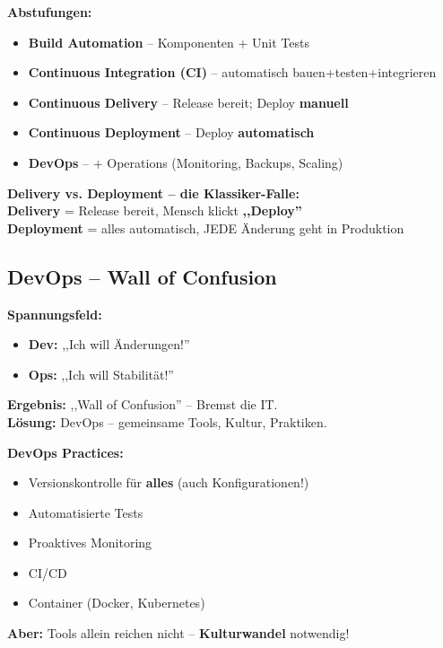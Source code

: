 \documentclass[11pt,a4paper]{article}
\begin{document}
\begin{keyfacts}
\textbf{Abstufungen:}
\begin{itemize}
  \item \textbf{Build Automation} -- Komponenten + Unit Tests
  \item \textbf{Continuous Integration (CI)} -- automatisch bauen+testen+integrieren
  \item \textbf{Continuous Delivery} -- Release bereit; Deploy \textbf{manuell}
  \item \textbf{Continuous Deployment} -- Deploy \textbf{automatisch}
  \item \textbf{DevOps} -- + Operations (Monitoring, Backups, Scaling)
\end{itemize}
\end{keyfacts}

\begin{trap}
\textbf{Delivery vs. Deployment -- die Klassiker-Falle:}\\
\textbf{Delivery} = Release bereit, Mensch klickt \textbf{,,Deploy''}\\
\textbf{Deployment} = alles automatisch, JEDE Änderung geht in Produktion
\end{trap}

\subsection{DevOps -- Wall of Confusion}

\begin{story}
\textbf{Spannungsfeld:}
\begin{itemize}
  \item \textbf{Dev:} ,,Ich will Änderungen!''
  \item \textbf{Ops:} ,,Ich will Stabilität!''
\end{itemize}
\textbf{Ergebnis:} ,,Wall of Confusion'' -- Bremst die IT.\\
\textbf{Lösung:} DevOps -- gemeinsame Tools, Kultur, Praktiken.
\end{story}

\begin{keyfacts}
\textbf{DevOps Practices:}
\begin{itemize}
  \item Versionskontrolle für \textbf{alles} (auch Konfigurationen!)
  \item Automatisierte Tests
  \item Proaktives Monitoring
  \item CI/CD
  \item Container (Docker, Kubernetes)
\end{itemize}
\textbf{Aber:} Tools allein reichen nicht -- \textbf{Kulturwandel} notwendig!
\end{keyfacts}
\end{document}
